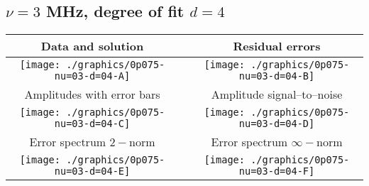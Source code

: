 

% 

\clearpage{}
\break{}

\subsection{$\nu = 3$ MHz, degree of fit $d = 4$}

\begin{table}[h]
    \begin{center}
        \begin{tabular}{ccc}
            Data and solution & \quad & Residual errors \\\hline
            \texttt{[image: ./graphics/0p075-nu=03-d=04-A]} &&
            \texttt{[image: ./graphics/0p075-nu=03-d=04-B]} \\[15pt]
            Amplitudes with error bars && Amplitude signal--to--noise \\\hline
            \texttt{[image: ./graphics/0p075-nu=03-d=04-C]} &&
            \texttt{[image: ./graphics/0p075-nu=03-d=04-D]} \\[15pt]
            Error spectrum $2-$norm && Error spectrum $\infty-$norm \\\hline
            \texttt{[image: ./graphics/0p075-nu=03-d=04-E]} &&
            \texttt{[image: ./graphics/0p075-nu=03-d=04-F]} \\[15pt]
        \end{tabular}
    \end{center}
\label{fig:elev=75, nu=3}
\end{table}



\endinput
